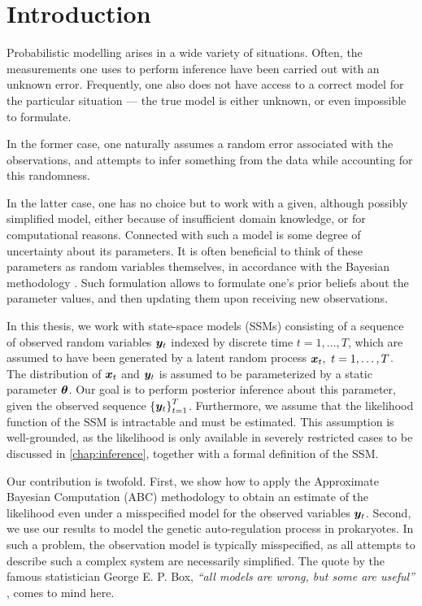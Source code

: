 \chapter{Introduction}
\label{chap:introduction}

Probabilistic modelling arises in a wide variety of situations. Often, the measurements one uses to perform inference have been carried out with an unknown error. Frequently, one also does not have access to a correct model for the particular situation --- the true model is either unknown, or even impossible to formulate.

In the former case, one naturally assumes a random error associated with the observations, and attempts to infer something from the data while accounting for this randomness.

In the latter case, one has no choice but to work with a given, although possibly simplified model, either because of insufficient domain knowledge, or for computational reasons. Connected with such a model is some degree of uncertainty about its parameters. It is often beneficial to think of these parameters as random variables themselves, in accordance with the Bayesian methodology \citep{bayes}. Such formulation allows to formulate one's prior beliefs about the parameter values, and then updating them upon receiving new observations.

In this thesis, we work with state-space models (SSMs) consisting of a sequence of observed random variables $\bm{y}_t$ indexed by discrete time $t = 1, \ldots, T$, which are assumed to have been generated by a latent random process $\bm{x}_t,\ t = 1, \ldots, T$. The distribution of $\bm{x}_t$ and $\bm{y}_t$ is assumed to be parameterized by a static parameter $\bm{\theta}$. Our goal is to perform posterior inference about this parameter, given the observed sequence $\left\{\bm{y}_t\right\}_{t=1}^T$. Furthermore, we assume that the likelihood function of the SSM is intractable and must be estimated. This assumption is well-grounded, as the likelihood is only available in severely restricted cases to be discussed in \autoref{chap:inference}, together with a formal definition of the SSM.

Our contribution is twofold. First, we show how to apply the Approximate Bayesian Computation (ABC) methodology \citep{abc-old-old, abc-old} to obtain an estimate of the likelihood even under a misspecified model for the observed variables $\bm{y}_t$. Second, we use our results to model the genetic auto-regulation process in prokaryotes. In such a problem, the observation model is typically misspecified, as all attempts to describe such a complex system are necessarily simplified. The quote by the famous statistician George E. P. Box, \emph{``all models are wrong, but some are useful''} \citep{box-quote}, comes to mind here.


